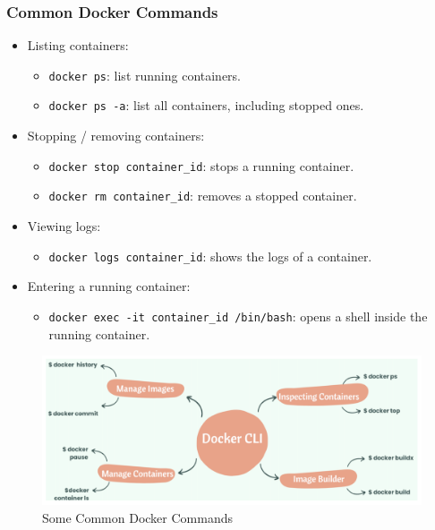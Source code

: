 \documentclass[a4paper,11pt]{article}
\begin{document}
\subsubsection{Common Docker Commands}
\begin{itemize}
    \item   Listing containers:
            \begin{itemize}
                \item   \texttt{docker ps}: list running containers.
                \item   \texttt{docker ps -a}: list all containers, including stopped ones.
            \end{itemize}

    \item   Stopping / removing containers:
            \begin{itemize}
                \item   \texttt{docker stop container_id}: stops a running container.
                \item   \texttt{docker rm container_id}: removes a stopped container.
            \end{itemize}

    \item   Viewing logs:
            \begin{itemize}
                \item   \texttt{docker logs container_id}: shows the logs of a container.
            \end{itemize}

    \item   Entering a running container:
            \begin{itemize}
                \item   \texttt{docker exec -it container_id /bin/bash}: opens a shell inside the running
                        container.
            \end{itemize}
\end{itemize}

\begin{figure}[H]
    \centering \includegraphics[width=\textwidth]{images/common_docker_cmds.png}
    \caption{Some Common Docker Commands}
\end{figure}
\end{document}
